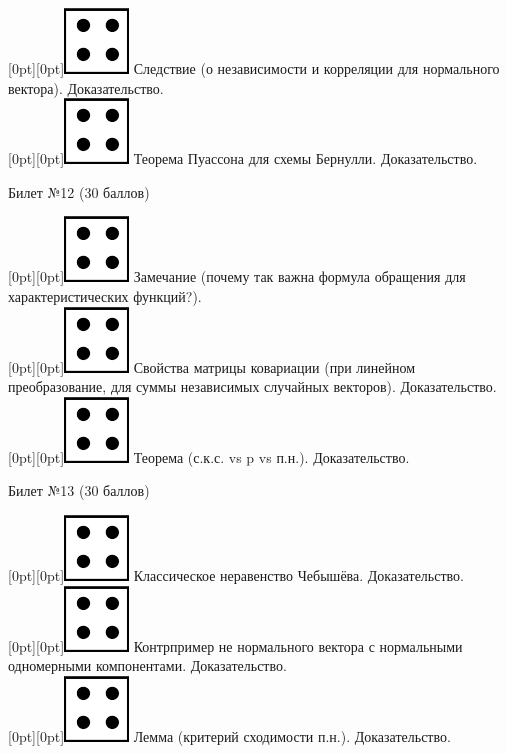 \documentclass[preview]{standalone}
\begin{document}
\raisebox{-1pt}[0pt][0pt]{\includegraphics[width=0.02\linewidth]{4.png}} Следствие (о независимости и корреляции для нормального вектора). Доказательство. \\ 
\raisebox{-1pt}[0pt][0pt]{\includegraphics[width=0.02\linewidth]{4.png}} Теорема Пуассона для схемы Бернулли. Доказательство. \\
\begin{center} {\Large Билет №12 (30 баллов)} \end{center}
\raisebox{-1pt}[0pt][0pt]{\includegraphics[width=0.02\linewidth]{4.png}} Замечание (почему так важна формула обращения для характеристических функций?). \\
\raisebox{-1pt}[0pt][0pt]{\includegraphics[width=0.02\linewidth]{4.png}} Свойства матрицы ковариации (при линейном преобразование, для суммы независимых случайных векторов). Доказательство. \\
\raisebox{-1pt}[0pt][0pt]{\includegraphics[width=0.02\linewidth]{4.png}} Теорема (с.к.с. vs p vs п.н.). Доказательство. \\ 
\begin{center} {\Large Билет №13 (30 баллов)} \end{center}
\raisebox{-1pt}[0pt][0pt]{\includegraphics[width=0.02\linewidth]{4.png}} Классическое неравенство Чебышёва. Доказательство. \\
\raisebox{-1pt}[0pt][0pt]{\includegraphics[width=0.02\linewidth]{4.png}} Контрпример не нормального вектора с нормальными одномерными компонентами. Доказательство. \\ 
\raisebox{-1pt}[0pt][0pt]{\includegraphics[width=0.02\linewidth]{4.png}} Лемма (критерий сходимости п.н.). Доказательство. \\
\end{document}
